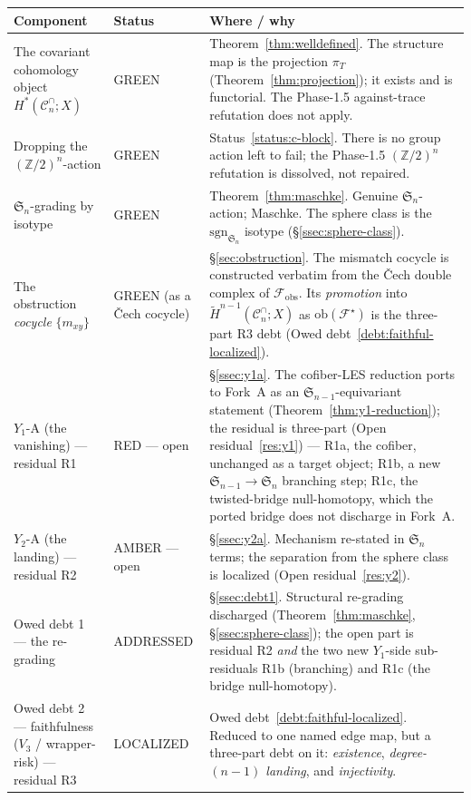 \documentclass[11pt,oneside]{amsart}
\theoremstyle{plain}
\theoremstyle{definition}
\theoremstyle{remark}
\theoremstyle{honeststyle}
\newcommand{\F}{\mathcal{F}}
\newcommand{\Fstar}{\F^{\star}}
\newcommand{\sgn}{\mathrm{sgn}}
\newcommand{\Sym}{\mathfrak{S}}
\newcommand{\Z}{\mathbb{Z}}
\newcommand{\Cn}{\mathcal{C}^{\cap}_n}
\newcommand{\ob}{\mathrm{ob}}
\newcommand{\fobs}{\mathcal{F}_{\mathrm{obs}}}
\begin{document}
{\small
\begin{longtable}{p{}p{}p{}}
\toprule
\textbf{Component} & \textbf{Status} & \textbf{Where / why}\\
\midrule
\endhead
The covariant cohomology object $H^{*}(\Cn;X)$
 & \textsf{GREEN}
 & Theorem~\ref{thm:welldefined}. The structure map is the projection
   $\pi_T$ (Theorem~\ref{thm:projection}); it exists and is functorial.
   The Phase-1.5 against-trace refutation does not apply.\\
Dropping the $(\Z/2)^n$-action
 & \textsf{GREEN}
 & Status~\ref{status:c-block}. There is no group action left to fail;
   the Phase-1.5 $(\Z/2)^n$ refutation is dissolved, not repaired.\\
$\Sym_n$-grading by isotype
 & \textsf{GREEN}
 & Theorem~\ref{thm:maschke}. Genuine $\Sym_n$-action; Maschke.
   The sphere class is the $\sgn_{\Sym_n}$ isotype
   (\S\ref{ssec:sphere-class}).\\
The obstruction \emph{cocycle} $\{m_{xy}\}$
 & \textsf{GREEN} (as a \v{C}ech cocycle)
 & \S\ref{sec:obstruction}. The mismatch cocycle is constructed
   verbatim from the \v{C}ech double complex of $\fobs$. Its
   \emph{promotion} into $\widetilde H^{n-1}(\Cn;X)$ as $\ob(\Fstar)$
   is the three-part R3 debt (Owed
   debt~\ref{debt:faithful-localized}).\\
$Y_1$-A (the vanishing) --- residual R1
 & \textsf{RED --- open}
 & \S\ref{ssec:y1a}. The cofiber-LES reduction ports to Fork~A as an
   $\Sym_{n-1}$-equivariant statement
   (Theorem~\ref{thm:y1-reduction}); the residual is three-part (Open
   residual~\ref{res:y1}) --- R1a, the cofiber, unchanged as a target
   object; R1b, a new $\Sym_{n-1}\to\Sym_n$ branching step; R1c, the
   twisted-bridge null-homotopy, which the ported bridge does not
   discharge in Fork~A.\\
$Y_2$-A (the landing) --- residual R2
 & \textsf{AMBER --- open}
 & \S\ref{ssec:y2a}. Mechanism re-stated in $\Sym_n$ terms; the
   separation from the sphere class is localized
   (Open residual~\ref{res:y2}).\\
Owed debt 1 --- the re-grading
 & \textsf{ADDRESSED}
 & \S\ref{ssec:debt1}. Structural re-grading discharged
   (Theorem~\ref{thm:maschke}, \S\ref{ssec:sphere-class}); the open
   part is residual R2 \emph{and} the two new $Y_1$-side
   sub-residuals R1b (branching) and R1c (the bridge
   null-homotopy).\\
Owed debt 2 --- faithfulness ($V_3$ / wrapper-risk) --- residual R3
 & \textsf{LOCALIZED}
 & Owed debt~\ref{debt:faithful-localized}. Reduced to one named edge
   map, but a three-part debt on it: \emph{existence},
   \emph{degree-$(n-1)$ landing}, and \emph{injectivity}.\\
\bottomrule
\end{longtable}}
\end{document}
